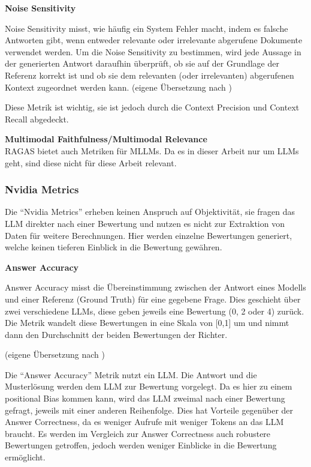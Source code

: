 \textbf{Noise Sensitivity}\\
\begin{plainquote}
Noise Sensitivity misst, wie häufig ein System Fehler macht, indem es falsche Antworten gibt, wenn entweder relevante oder irrelevante abgerufene Dokumente verwendet werden.
Um die Noise Sensitivity zu bestimmen, wird jede Aussage in der generierten Antwort daraufhin überprüft, ob sie auf der Grundlage der Referenz korrekt ist und ob sie dem relevanten (oder irrelevanten) abgerufenen Kontext zugeordnet werden kann.
(eigene Übersetzung nach \cite{ragas_noise_sensitivity})
\end{plainquote}
Diese Metrik ist wichtig, sie ist jedoch durch die Context Precision und Context Recall abgedeckt.

\textbf{Multimodal Faithfulness/Multimodal Relevance}\\
RAGAS bietet auch Metriken für MLLMs. Da es in dieser Arbeit nur um LLMs geht, sind diese nicht für diese Arbeit relevant.

\subsubsection{Nvidia Metrics}
Die \enquote{Nvidia Metrics} erheben keinen Anspruch auf Objektivität, sie fragen das LLM direkter nach einer Bewertung und nutzen es nicht zur Extraktion von Daten für weitere Berechnungen.
Hier werden einzelne Bewertungen generiert, welche keinen tieferen Einblick in die Bewertung gewähren.

\textbf{Answer Accuracy}\\
\begin{plainquote}
Answer Accuracy misst die Übereinstimmung zwischen der Antwort eines Modells und einer Referenz (Ground Truth) für eine gegebene Frage. Dies geschieht über zwei verschiedene LLMs, diese geben jeweils eine Bewertung (0, 2 oder 4) zurück. Die Metrik wandelt diese Bewertungen in eine Skala von [0,1] um und nimmt dann den Durchschnitt der beiden Bewertungen der Richter.

(eigene Übersetzung nach \cite{ragas_nvidia_metrics})
\end{plainquote}

Die \enquote{Answer Accuracy} Metrik nutzt ein LLM. Die Antwort und die Musterlösung werden dem LLM zur Bewertung vorgelegt. Da es hier zu einem positional Bias kommen kann, wird das LLM zweimal nach einer Bewertung gefragt, jeweils mit einer anderen Reihenfolge.
Dies hat Vorteile gegenüber der Answer Correctness, da es weniger Aufrufe mit weniger Tokens an das LLM braucht.
Es werden im Vergleich zur Answer Correctness auch robustere Bewertungen getroffen, jedoch werden weniger Einblicke in die Bewertung ermöglicht.

